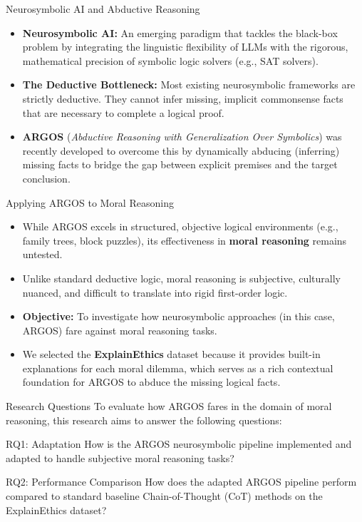 \documentclass{beamer}
\begin{document}
    \begin{frame}{Neurosymbolic AI and Abductive Reasoning}
        \begin{itemize}
            \item \textbf{Neurosymbolic AI:} An emerging paradigm that tackles the black-box problem by integrating the linguistic flexibility of LLMs with the rigorous, mathematical precision of symbolic logic solvers (e.g., SAT solvers).
            \item \textbf{The Deductive Bottleneck:} Most existing neurosymbolic frameworks are strictly deductive. They cannot infer missing, implicit commonsense facts that are necessary to complete a logical proof.
            \item \textbf{ARGOS} (\textit{Abductive Reasoning with Generalization Over Symbolics}) was recently developed to overcome this by dynamically abducing (inferring) missing facts to bridge the gap between explicit premises and the target conclusion.
        \end{itemize}
    \end{frame}

    \begin{frame}{Applying ARGOS to Moral Reasoning}
        \begin{itemize}
            \item While ARGOS excels in structured, objective logical environments (e.g., family trees, block puzzles), its effectiveness in \textbf{moral reasoning} remains untested.
            \item Unlike standard deductive logic, moral reasoning is subjective, culturally nuanced, and difficult to translate into rigid first-order logic.
            \item \textbf{Objective:} To investigate how neurosymbolic approaches (in this case, ARGOS) fare against moral reasoning tasks.
            \item We selected the \textbf{ExplainEthics} dataset because it provides built-in explanations for each moral dilemma, which serves as a rich contextual foundation for ARGOS to abduce the missing logical facts.
        \end{itemize}
    \end{frame}

    \begin{frame}{Research Questions}
        To evaluate how ARGOS fares in the domain of moral reasoning, this research aims to answer the following questions:
        \vspace{0.5cm}
        \begin{block}{RQ1: Adaptation}
            How is the ARGOS neurosymbolic pipeline implemented and adapted to handle subjective moral reasoning tasks?
        \end{block}
        \begin{block}{RQ2: Performance Comparison}
            How does the adapted ARGOS pipeline perform compared to standard baseline Chain-of-Thought (CoT) methods on the ExplainEthics dataset?
        \end{block}
    \end{frame}
\end{document}

